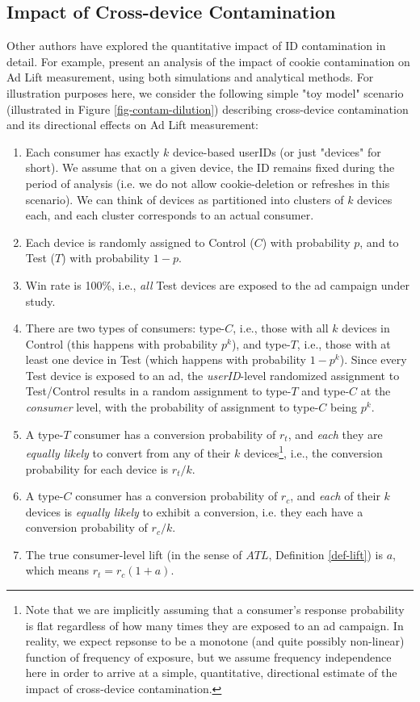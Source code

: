\documentclass[11pt,a4paper]{article}
\theoremstyle{definition}
\theoremstyle{remark}
\theoremstyle{definition}
\theoremstyle{definition}
\theoremstyle{definition}
\theoremstyle{definition}
\theoremstyle{definition}
\theoremstyle{definition}
\begin{document}
\subsection{Impact of Cross-device Contamination}
Other authors have explored the quantitative impact of ID contamination in detail. For example, \cite{coey2016people} present an analysis of the impact of cookie contamination on Ad Lift measurement, using both simulations and analytical methods. For illustration purposes here, we consider the following simple "toy model" scenario (illustrated in Figure \ref{fig-contam-dilution}) describing cross-device contamination and its directional effects on Ad Lift measurement:
\begin{enumerate}
	\item Each consumer has exactly $k$ device-based userIDs (or just "devices" for short). We assume that on a given device, the ID remains fixed during the period of analysis (i.e. we do not allow cookie-deletion or refreshes in this scenario). 
	We can think of devices as partitioned into clusters of $k$ devices each, and each cluster corresponds to an actual consumer.
	\item Each device is randomly assigned to Control ($C$) with probability $p$, and to Test ($T$) with probability $1-p$.
	\item Win rate is 100\%, i.e., \textit{all} Test devices are exposed to the ad campaign under study.
	\item There are two types of consumers: type-$C$, i.e., those with all $k$ devices in Control (this happens with probability $p^k$), and type-$T$, i.e., those with at least one device in Test (which happens with probability $1-p^k$). Since every Test device is exposed to an ad, the \textit{userID}-level randomized assignment to Test/Control results in a random assignment to type-$T$ and type-$C$ at the \textit{consumer} level, with the probability of assignment to type-$C$ being $p^k$.
	\item A type-$T$ consumer has a conversion probability of $r_t$, and \textit{each} they are \textit{equally likely} to convert from any of their $k$ devices\footnote{Note that we are implicitly assuming that a consumer's response probability is flat regardless of how many times they are exposed to an ad campaign. In reality, we expect repsonse to be a monotone (and quite possibly non-linear) function of frequency of exposure, but we assume frequency independence here in order to arrive at a simple, quantitative, directional estimate of the impact of cross-device contamination.}, i.e., the conversion probability for each device is $r_t/k$. 
	\item A type-$C$ consumer has a conversion probability of $r_c$, and \textit{each} of their $k$ devices is \textit{equally likely} to exhibit a conversion, i.e. they each have a conversion probability of $r_c/k$.
	\item The true consumer-level lift (in the sense of $ATL$, Definition \ref{def-lift}) is $a$, which means $r_t = r_c(1+a)$.
\end{enumerate}
\end{document}

